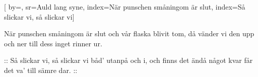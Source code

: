 

[ 		%
	by={},					%
	sr={Auld lang syne},					%
	index={När punschen småningom är slut}, %
	index={Så slickar vi, så slickar vi}]						%
	

\beginverse*						%
När punschen småningom är slut
och vår flaska blivit tom,
då vänder vi den upp och ner
till dess inget rinner ur.
\endverse							%

\beginchorus						%
:: Så slickar vi, så slickar vi
båd' utanpå och i,
och finns det ändå något kvar
får det va' till sämre dar. ::
\endchorus


\endsong							%